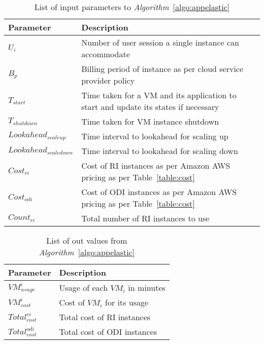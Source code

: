 \begin{center}
  \begin{table}
    \begin{tabular}{ | L{6cm} | L{6cm} |}
      \hline
      Parameter & Description \\ \hline
      \( U_{i} \) & Number of user session a single instance can accommodate  \\ \hline
      \( B_{p} \) & Billing period of instance as per cloud service provider policy \\ \hline
      \( T_{start} \) & Time taken for a VM and its application to start  and update its states if necessary  \\ \hline
      \( T_{shutdown} \) & Time taken for VM instance shutdown\\ \hline
      $Lookahead_{scaleup}$ & Time interval to lookahead for scaling up \\ \hline
      $Lookahead_{scaledown}$ & Time interval to lookahead for scaling down \\ \hline
      $Cost_{ri}$ & Cost of RI instances as per Amazon AWS pricing as per Table~\ref{table:cost} \\ \hline
      $Cost_{odi}$ & Cost of ODI instances as per Amazon AWS pricing as per Table~\ref{table:cost} \\ \hline
      $Count_{ri}$ & Total number of RI instances to use \\ \hline
    \end{tabular}
    \caption{List of input parameters to \textit{Algorithm}~\ref{algo:appelastic}}
     \label{table:appelasticparatable}
\end{table}
\end{center}

\begin{center}
  \begin{table}
    \begin{tabular}{ | L{6cm} | L{6cm} |}
      \hline
      Parameter & Description \\ \hline
      $VM_{usage}^{i}$ & Usage of each $VM_{i}$ in minutes  \\ \hline
      $VM_{cost}^{i}$ & Cost of $VM_{i}$ for its usage \\ \hline
      $Total_{cost}^{ri}$ & Total cost of RI instances \\ \hline
      $Total_{cost}^{odi}$ & Total cost of ODI instances \\ \hline
    \end{tabular}
    \caption{List of out values from \textit{Algorithm}~\ref{algo:appelastic}}
     \label{table:outputtableodiri}
\end{table}
\end{center}

